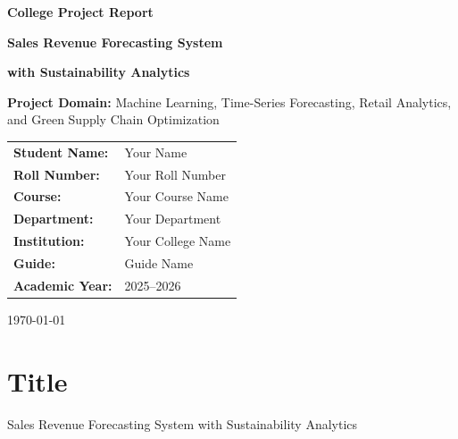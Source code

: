 \documentclass[12pt,a4paper]{article}
\begin{document}
\begin{titlepage}
\centering
\vspace*{1cm}

{\Large\bfseries College Project Report\par}
\vspace{1.5cm}

{\huge\bfseries Sales Revenue Forecasting System\par}
\vspace{0.4cm}
{\Large\bfseries with Sustainability Analytics\par}
\vspace{1.5cm}

\begin{tcolorbox}[
    enhanced,
    colback=SoftBlue,
    colframe=PrimaryBlue,
    width=0.88\textwidth,
    boxrule=1pt,
    arc=4pt
]
\centering
\textbf{Project Domain:} Machine Learning, Time-Series Forecasting, Retail Analytics, and Green Supply Chain Optimization
\end{tcolorbox}

\vspace{1.2cm}

\begin{tabular}{>{\bfseries}p{5cm} p{7cm}}
Student Name: & Your Name \\
Roll Number: & Your Roll Number \\
Course: & Your Course Name \\
Department: & Your Department \\
Institution: & Your College Name \\
Guide: & Guide Name \\
Academic Year: & 2025--2026 \\
\end{tabular}

\vfill
{\large \today\par}
\end{titlepage}

\tableofcontents
\newpage
{}

\section*{Title}
Sales Revenue Forecasting System with Sustainability Analytics
\end{document}
